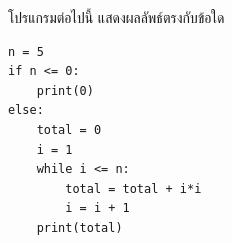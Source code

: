 \question โปรแกรมต่อไปนี้ แสดงผลลัพธ์ตรงกับข้อใด 
\begin{verbatim}
n = 5
if n <= 0:
    print(0)
else:
    total = 0
    i = 1
    while i <= n:
        total = total + i*i
        i = i + 1
    print(total)
\end{verbatim}
